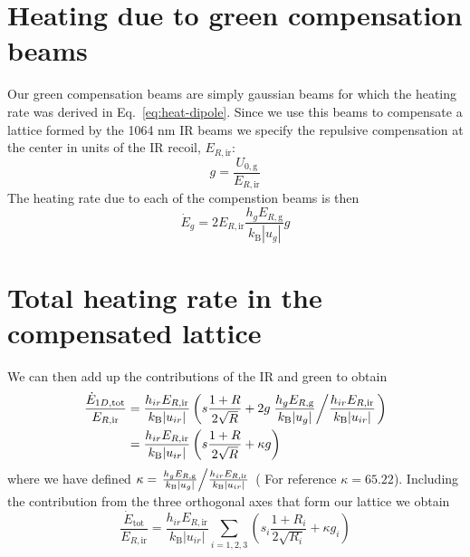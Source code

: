 \documentclass[11pt,letter]{article}
\begin{document}
\section{Heating due to green compensation beams}


Our green compensation beams are simply gaussian beams for which the heating
rate was derived in Eq.~\ref{eq:heat-dipole}.   Since we use this beams to
compensate a lattice formed by the 1064 nm IR beams we specify the
repulsive compensation at the center in units of the IR recoil,
$E_{R,\text{ir}}$:
\begin{equation} 
  g = \frac{U_{0,\text{g}}}{ E_{R,\text{ir}}}
\end{equation}
The heating rate due to each of the compenstion beams is then 
\begin{equation}
\boxed{
 \dot{E}_{g} = 
   2 E_{R,\text{ir}} \frac{ h_{g} E_{R,\text{g}} }{k_{\text{B}}|u_{g}|} g }
\end{equation}

\section{Total heating rate in the compensated lattice}

We can then add up the contributions of the IR and green to obtain 
\begin{equation}
\begin{split}
 \frac{\dot{E}_{1D,\text{tot}}}{ E_{R,\text{ir}} } & =
 \frac{ h_{ir} E_{R,\text{ir}} }{k_{\text{B}}|u_{ir}|} 
  \left(
  s \frac{1+R}{2\sqrt{R}}  + 
  2g
 \left. 
 \frac{ h_{g} E_{R,\text{g}} }{k_{\text{B}}|u_{g}|} \middle /
 \frac{ h_{ir} E_{R,\text{ir}} }{k_{\text{B}}|u_{ir}|} \right.
\right) \\
  & = 
 \frac{ h_{ir} E_{R,\text{ir}} }{k_{\text{B}}|u_{ir}|} 
  \left(
  s \frac{1+R}{2\sqrt{R}}  +
  \kappa g  
\right) \\
\end{split}  
\end{equation}
where we have defined $\kappa = \left.  \frac{ h_{g} E_{R,\text{g}}
}{k_{\text{B}}|u_{g}|} \middle / \frac{ h_{ir} E_{R,\text{ir}}
}{k_{\text{B}}|u_{ir}|} \right.$ ( For reference $\kappa = 65.22$).  Including
the contribution from the three orthogonal axes that form our lattice we
obtain
\begin{equation}
 \frac{ \dot{E}_{\text{tot}} }{ E_{R,\text{ir}} }  = 
 \frac{ h_{ir} E_{R,\text{ir}} }{k_{\text{B}}|u_{ir}|}
  \sum_{i=1,2,3} 
  \left(
  s_{i} \frac{1+R_{i}}{2\sqrt{R_{i}}}  + 
  \kappa g_{i} \right)
\end{equation} 
\end{document}
